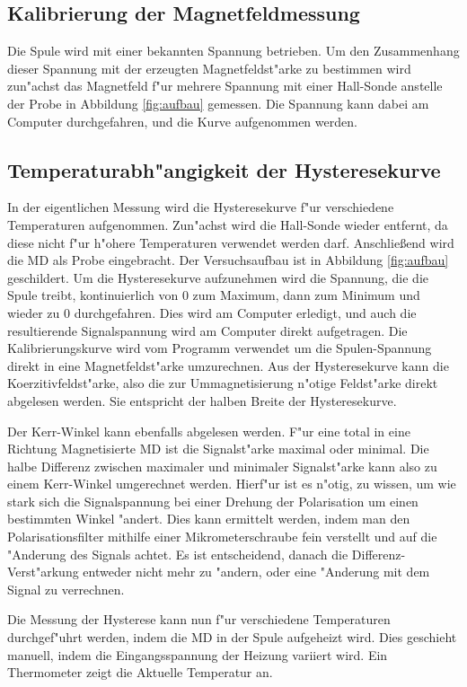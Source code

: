 \subsection{Kalibrierung der Magnetfeldmessung}
Die Spule wird mit einer bekannten Spannung betrieben.
Um den Zusammenhang dieser Spannung mit der erzeugten Magnetfeldst"arke zu bestimmen wird zun"achst das Magnetfeld f"ur mehrere Spannung mit einer Hall-Sonde anstelle der Probe in Abbildung \vref{fig:aufbau} gemessen.
Die Spannung kann dabei am Computer durchgefahren, und die Kurve aufgenommen werden.

\subsection{Temperaturabh"angigkeit der Hysteresekurve}
In der eigentlichen Messung wird die Hysteresekurve f"ur verschiedene Temperaturen aufgenommen.
Zun"achst wird die Hall-Sonde wieder entfernt, da diese nicht f"ur h"ohere Temperaturen verwendet werden darf.
Anschlie{\ss}end wird die MD als Probe eingebracht.
Der Versuchsaufbau ist in Abbildung \ref{fig:aufbau} geschildert.
Um die Hysteresekurve aufzunehmen wird die Spannung, die die Spule treibt, kontinuierlich von 0 zum Maximum, dann zum Minimum und wieder zu 0 durchgefahren.
Dies wird am Computer erledigt, und auch die resultierende Signalspannung wird am Computer direkt aufgetragen.
Die Kalibrierungskurve wird vom Programm verwendet um die Spulen-Spannung direkt in eine Magnetfeldst"arke umzurechnen.
Aus der Hysteresekurve kann die Koerzitivfeldst"arke, also die zur Ummagnetisierung n"otige Feldst"arke direkt abgelesen werden.
Sie entspricht der halben Breite der Hysteresekurve.

Der Kerr-Winkel kann ebenfalls abgelesen werden.
F"ur eine total in eine Richtung Magnetisierte MD ist die Signalst"arke maximal oder minimal.
Die halbe Differenz zwischen maximaler und minimaler Signalst"arke kann also zu einem Kerr-Winkel umgerechnet werden.
Hierf"ur ist es n"otig, zu wissen, um wie stark sich die Signalspannung bei einer Drehung der Polarisation um einen bestimmten Winkel "andert.
Dies kann ermittelt werden, indem man den Polarisationsfilter mithilfe einer Mikrometerschraube fein verstellt und auf die "Anderung des Signals achtet.
Es ist entscheidend, danach die Differenz-Verst"arkung entweder nicht mehr zu "andern, oder eine "Anderung mit dem Signal zu verrechnen.

Die Messung der Hysterese kann nun f"ur verschiedene Temperaturen durchgef"uhrt werden, indem die MD in der Spule aufgeheizt wird.
Dies geschieht manuell, indem die Eingangsspannung der Heizung variiert wird.
Ein Thermometer zeigt die Aktuelle Temperatur an.
